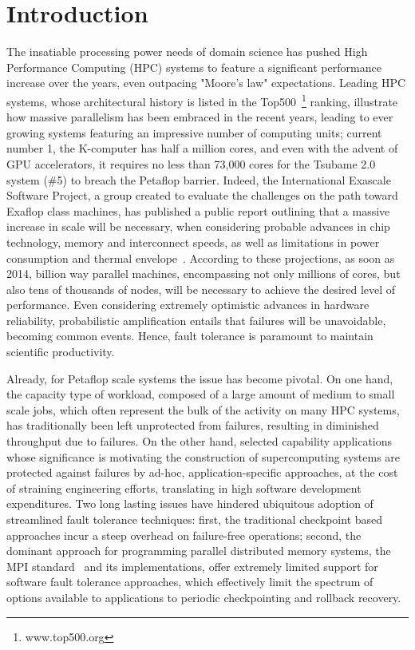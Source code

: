 \section{Introduction}

The insatiable processing power needs of domain science has pushed High
Performance Computing (HPC) systems to feature a significant
performance increase over the years, even outpacing "Moore's law"
expectations. Leading HPC systems, whose architectural history is listed
in the Top500~\footnote{www.top500.org} ranking, illustrate how massive
parallelism has been embraced in the recent years, leading to ever
growing systems featuring an impressive number of computing units;
current number 1, the K-computer has half a million cores, and even with
the advent of GPU accelerators, it requires no less than 73,000
cores for the Tsubame 2.0 system (\#5) to breach the Petaflop
barrier. Indeed, the International Exascale Software Project, a group
created to evaluate the challenges on the path toward Exaflop class
machines, has published a public report outlining that a massive
increase in scale will be necessary, when considering probable advances
in chip technology, memory and interconnect speeds, as well as
limitations in power consumption and thermal envelope~\cite{iesp}.
According to these projections, as soon as 2014, billion way parallel
machines, encompassing not only millions of cores, but also tens of
thousands of nodes, will be necessary to achieve the desired level of
performance. Even considering extremely optimistic advances in hardware
reliability, probabilistic amplification entails that failures will be
unavoidable, becoming common events. Hence, fault tolerance is paramount
to maintain scientific productivity.

Already, for Petaflop scale systems the issue has become pivotal. On
one hand, the capacity type of workload, composed of a large amount of
medium to small scale jobs, which often represent the bulk of the
activity on many HPC systems, has traditionally been left unprotected
from failures, resulting in diminished throughput due to failures. On
the other hand, selected capability applications whose significance is
motivating the construction of supercomputing systems are protected
against failures by ad-hoc, application-specific approaches, at the
cost of straining engineering efforts, translating in high software
development expenditures. Two long lasting issues have hindered
ubiquitous adoption of streamlined fault tolerance techniques: first,
the traditional checkpoint based approaches incur a steep overhead on
failure-free operations; second, the dominant approach for programming
parallel distributed memory systems, the MPI standard~\cite{MPI22} and
its implementations, offer extremely limited support for software
fault tolerance approaches, which effectively limit the spectrum of
options available to applications to periodic checkpointing and
rollback recovery.

